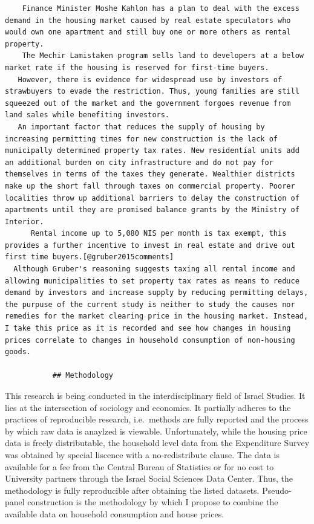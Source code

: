 \documentclass[12pt,a4paper,]{article}
\begin{document}
\begin{verbatim}
    Finance Minister Moshe Kahlon has a plan to deal with the excess demand in the housing market caused by real estate speculators who would own one apartment and still buy one or more others as rental property.
    The Mechir Lamistaken program sells land to developers at a below market rate if the housing is reserved for first-time buyers.
   However, there is evidence for widespread use by investors of strawbuyers to evade the restriction. Thus, young families are still squeezed out of the market and the government forgoes revenue from land sales while benefiting investors.
   An important factor that reduces the supply of housing by increasing permitting times for new construction is the lack of municipally determined property tax rates. New residential units add an additional burden on city infrastructure and do not pay for themselves in terms of the taxes they generate. Wealthier districts make up the short fall through taxes on commercial property. Poorer localities throw up additional barriers to delay the construction of apartments until they are promised balance grants by the Ministry of Interior.
      Rental income up to 5,080 NIS per month is tax exempt, this provides a further incentive to invest in real estate and drive out first time buyers.[@gruber2015comments]
  Although Gruber's reasoning suggests taxing all rental income and allowing municipalities to set property tax rates as means to reduce demand by investors and increase supply by reducing permitting delays, the purpuse of the current study is neither to study the causes nor remedies for the market clearing price in the housing market. Instead, I take this price as it is recorded and see how changes in housing prices correlate to changes in household consumption of non-housing goods.

           ## Methodology
\end{verbatim}

This research is being conducted in the interdisciplinary field of
Israel Studies. It lies at the intersection of sociology and economics.
It partially adheres to the practices of reproducible research,
i.e.~methods are fully reported and the process by which raw data is
anaylzed is viewable. Unfortunately, while the housing price data is
freely distributable, the household level data from the Expenditure
Survey was obtained by special liscence with a no-redistribute clause.
The data is available for a fee from the Central Bureau of Statistics or
for no cost to University partners through the Israel Social Sciences
Data Center. Thus, the methodology is fully reproducible after obtaining
the listed datasets. Pseudo-panel construction is the methodology by
which I propose to combine the available data on household consumption
and house prices.
\end{document}
